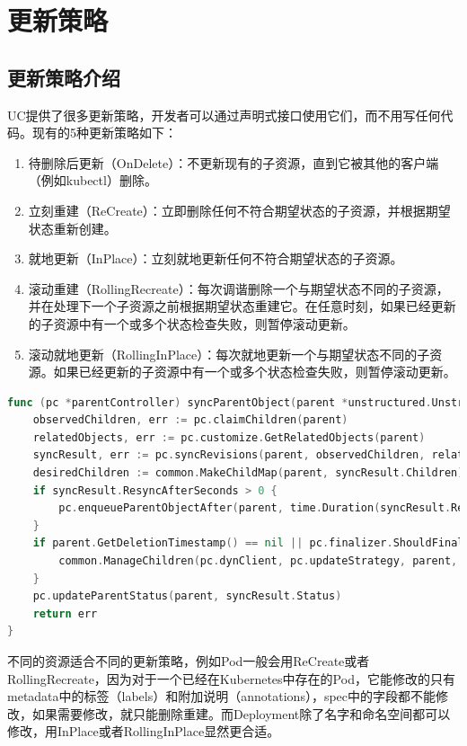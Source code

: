 \documentclass[macfonts,master]{njuthesis}
\begin{document}
\section{更新策略}
\subsection{更新策略介绍}
UC提供了很多更新策略，开发者可以通过声明式接口使用它们，而不用写任何代码。现有的5种更新策略如下：
\begin{enumerate}
	\item 待删除后更新（OnDelete）：不更新现有的子资源，直到它被其他的客户端（例如kubectl）删除。
	\item 立刻重建（ReCreate）：立即删除任何不符合期望状态的子资源，并根据期望状态重新创建。
	\item 就地更新（InPlace）：立刻就地更新任何不符合期望状态的子资源。
	\item 滚动重建（RollingRecreate）：每次调谐删除一个与期望状态不同的子资源，并在处理下一个子资源之前根据期望状态重建它。在任意时刻，如果已经更新的子资源中有一个或多个状态检查失败，则暂停滚动更新。
	\item 滚动就地更新（RollingInPlace）：每次就地更新一个与期望状态不同的子资源。如果已经更新的子资源中有一个或多个状态检查失败，则暂停滚动更新。
\end{enumerate}

\begin{lstlisting}[language=Go,caption=同步父资源,label=listing:syncparent]
func (pc *parentController) syncParentObject(parent *unstructured.Unstructured) error {
	observedChildren, err := pc.claimChildren(parent)
	relatedObjects, err := pc.customize.GetRelatedObjects(parent)
	syncResult, err := pc.syncRevisions(parent, observedChildren, relatedObjects)
	desiredChildren := common.MakeChildMap(parent, syncResult.Children)
	if syncResult.ResyncAfterSeconds > 0 {
		pc.enqueueParentObjectAfter(parent, time.Duration(syncResult.ResyncAfterSeconds*float64(time.Second)))
	}
	if parent.GetDeletionTimestamp() == nil || pc.finalizer.ShouldFinalize(parent) {
		common.ManageChildren(pc.dynClient, pc.updateStrategy, parent, observedChildren, desiredChildren)
	}
	pc.updateParentStatus(parent, syncResult.Status)
	return err
}
\end{lstlisting}

不同的资源适合不同的更新策略，例如Pod一般会用ReCreate或者RollingRecreate，因为对于一个已经在Kubernetes中存在的Pod，它能修改的只有metadata中的标签（labels）和附加说明（annotations），spec中的字段都不能修改，如果需要修改，就只能删除重建。而Deployment除了名字和命名空间都可以修改，用InPlace或者RollingInPlace显然更合适。
\end{document}
